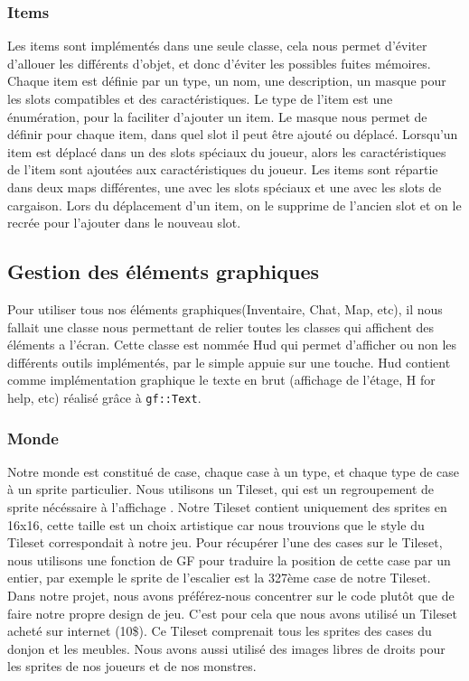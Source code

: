 \documentclass[a4paper, 12pt, twoside]{article}
\begin{document}
\subsubsection{Items}
Les items sont implémentés dans une seule classe, cela nous permet d'éviter d'allouer les différents d'objet, et donc d'éviter les possibles fuites mémoires. Chaque item est définie par un type, un nom, une description, un masque pour les slots compatibles et des caractéristiques. Le type de l'item est une énumération, pour la faciliter d'ajouter un item. Le masque nous permet de définir pour chaque item, dans quel slot il peut être ajouté ou déplacé. Lorsqu'un item est déplacé dans un des slots spéciaux du joueur, alors les caractéristiques de l'item sont ajoutées aux caractéristiques du joueur. Les items sont répartie dans deux maps différentes, une avec les slots spéciaux et une avec les slots de cargaison. Lors du déplacement d'un item, on le supprime de l'ancien slot et on le recrée pour l'ajouter dans le nouveau slot.

\newpage
\subsection{Gestion des éléments graphiques}
Pour utiliser tous nos éléments graphiques(Inventaire, Chat, Map, etc), il nous fallait une classe nous permettant de relier toutes les classes qui affichent des éléments a l'écran. Cette classe est nommée Hud qui permet d'afficher ou non les différents outils implémentés, par le simple appuie sur une touche. Hud contient comme implémentation graphique le texte en brut (affichage de l'étage, H for help, etc) réalisé grâce à \verb!gf::Text!.

\subsubsection{Monde}
Notre monde est constitué de case, chaque case à un type, et chaque type de case à un sprite particulier. Nous utilisons un Tileset, qui est un regroupement de sprite nécéssaire à l'affichage . Notre Tileset contient uniquement des sprites en 16x16, cette taille est un choix artistique car nous trouvions que le style du Tileset correspondait à notre jeu. Pour récupérer l'une des cases sur le Tileset, nous utilisons une fonction de GF pour traduire la position de cette case par un entier, par exemple le sprite de l'escalier est la 327ème case de notre Tileset. Dans notre projet, nous avons préférez-nous concentrer sur le code plutôt que de faire notre propre design de jeu. C'est pour cela que nous avons utilisé un Tileset acheté sur internet (10\$). Ce Tileset comprenait tous les sprites des cases du donjon et les meubles. Nous avons aussi utilisé des images libres de droits pour les sprites de nos joueurs et de nos monstres. 
\end{document}
